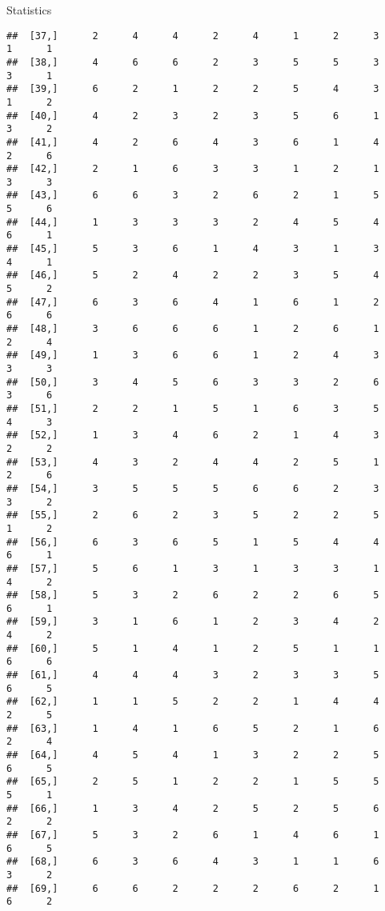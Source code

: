 \documentclass[
  ignorenonframetext,
]{beamer}
\begin{document}
\begin{frame}[fragile]{Statistics}
\begin{verbatim}
##  [37,]      2      4      4      2      4      1      2      3      1      1
##  [38,]      4      6      6      2      3      5      5      3      3      1
##  [39,]      6      2      1      2      2      5      4      3      1      2
##  [40,]      4      2      3      2      3      5      6      1      3      2
##  [41,]      4      2      6      4      3      6      1      4      2      6
##  [42,]      2      1      6      3      3      1      2      1      3      3
##  [43,]      6      6      3      2      6      2      1      5      5      6
##  [44,]      1      3      3      3      2      4      5      4      6      1
##  [45,]      5      3      6      1      4      3      1      3      4      1
##  [46,]      5      2      4      2      2      3      5      4      5      2
##  [47,]      6      3      6      4      1      6      1      2      6      6
##  [48,]      3      6      6      6      1      2      6      1      2      4
##  [49,]      1      3      6      6      1      2      4      3      3      3
##  [50,]      3      4      5      6      3      3      2      6      3      6
##  [51,]      2      2      1      5      1      6      3      5      4      3
##  [52,]      1      3      4      6      2      1      4      3      2      2
##  [53,]      4      3      2      4      4      2      5      1      2      6
##  [54,]      3      5      5      5      6      6      2      3      3      2
##  [55,]      2      6      2      3      5      2      2      5      1      2
##  [56,]      6      3      6      5      1      5      4      4      6      1
##  [57,]      5      6      1      3      1      3      3      1      4      2
##  [58,]      5      3      2      6      2      2      6      5      6      1
##  [59,]      3      1      6      1      2      3      4      2      4      2
##  [60,]      5      1      4      1      2      5      1      1      6      6
##  [61,]      4      4      4      3      2      3      3      5      6      5
##  [62,]      1      1      5      2      2      1      4      4      2      5
##  [63,]      1      4      1      6      5      2      1      6      2      4
##  [64,]      4      5      4      1      3      2      2      5      6      5
##  [65,]      2      5      1      2      2      1      5      5      5      1
##  [66,]      1      3      4      2      5      2      5      6      2      2
##  [67,]      5      3      2      6      1      4      6      1      6      5
##  [68,]      6      3      6      4      3      1      1      6      3      2
##  [69,]      6      6      2      2      2      6      2      1      6      2

\end{verbatim}
\end{frame}
\end{document}
